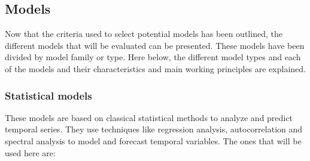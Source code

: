 \subsection{Models}
\label{s:models}
Now that the criteria used to select potential models has been outlined, the different models that will be evaluated can be presented. These models have been divided by model family or type. Here below, the different model types and each of the models and their characteristics and main working principles are explained. 
\subsubsection{Statistical models}
These models are based on classical statistical methods to analyze and predict temporal series. They use techniques like regression analysis, autocorrelation and spectral analysis to model and forecast temporal variables. The ones that will be used here are:
